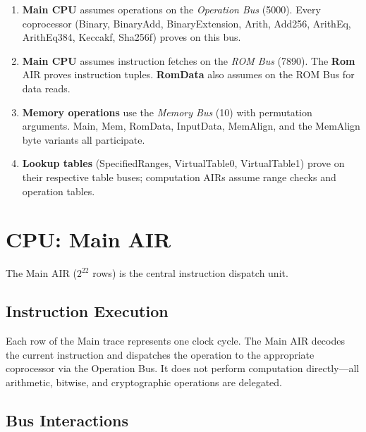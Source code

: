 \begin{enumerate}[nosep]
  \item \textbf{Main CPU} assumes operations on the \emph{Operation Bus} (5000).
        Every coprocessor (Binary, BinaryAdd, BinaryExtension, Arith,
        Add256, ArithEq, ArithEq384, Keccakf, Sha256f) proves on this bus.

  \item \textbf{Main CPU} assumes instruction fetches on the \emph{ROM Bus} (7890).
        The \textbf{Rom} AIR proves instruction tuples.
        \textbf{RomData} also assumes on the ROM Bus for data reads.

  \item \textbf{Memory operations} use the \emph{Memory Bus} (10) with permutation arguments.
        Main, Mem, RomData, InputData, MemAlign, and the MemAlign byte variants
        all participate.

  \item \textbf{Lookup tables} (SpecifiedRanges, VirtualTable0, VirtualTable1)
        prove on their respective table buses;
        computation AIRs assume range checks and operation tables.
\end{enumerate}

\section{CPU: Main AIR}
\label{sec:main}

The Main AIR ($2^{22}$ rows) is the central instruction dispatch unit.

\subsection{Instruction Execution}
\label{sec:main-execution}

Each row of the Main trace represents one clock cycle.
The Main AIR decodes the current instruction and dispatches the operation
to the appropriate coprocessor via the Operation Bus.
It does not perform computation directly---all arithmetic, bitwise,
and cryptographic operations are delegated.

\subsection{Bus Interactions}
\label{sec:main-buses}

